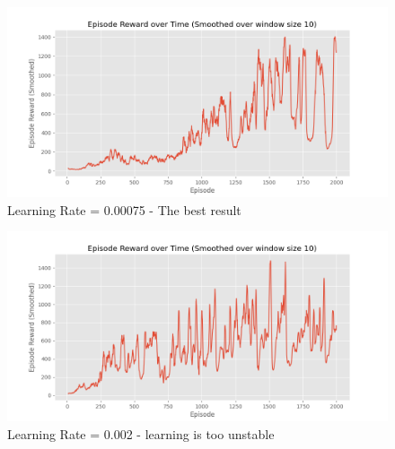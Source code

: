\documentclass[a4paper]{article}
\theoremstyle{definition}
\begin{document}
\begin{figure}[H]
    \centering
    \includegraphics[width=0.8\linewidth]{../lr00075_smooth.png}
    \caption{Learning Rate = 0.00075 - The best result}
    \label{fig:4}
\end{figure}


\begin{figure}[H]
    \centering
    \includegraphics[width=0.8\linewidth]{../lr002_smooth.png}
    \caption{Learning Rate = 0.002 - learning is too unstable}
    \label{fig:5}
\end{figure}
\end{document}
